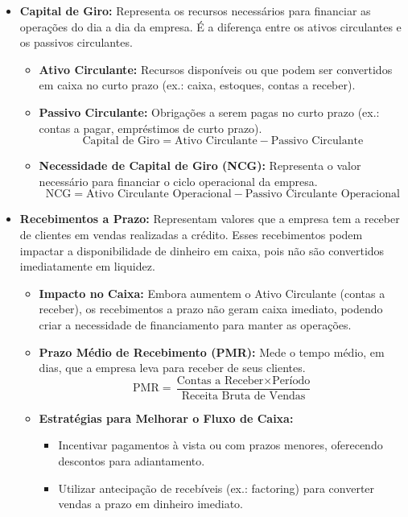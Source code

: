 \documentclass{article}
\begin{document}
\begin{itemize}
\begin{itemize}
\begin{equation}
        \end{equation}
    \end{itemize}
    \item \textbf{Capital de Giro:} Representa os recursos necessários para financiar as operações do dia a dia da empresa. É a diferença entre os ativos circulantes e os passivos circulantes. 
\begin{itemize}
    \item \textbf{Ativo Circulante:} Recursos disponíveis ou que podem ser convertidos em caixa no curto prazo (ex.: caixa, estoques, contas a receber). 
    \item \textbf{Passivo Circulante:} Obrigações a serem pagas no curto prazo (ex.: contas a pagar, empréstimos de curto prazo). 
    \begin{equation}
        \text{Capital de Giro} = \text{Ativo Circulante} - \text{Passivo Circulante}
    \end{equation}
    \item \textbf{Necessidade de Capital de Giro (NCG):} Representa o valor necessário para financiar o ciclo operacional da empresa. 
        \begin{equation}
            \text{NCG} = \text{Ativo Circulante Operacional} - \text{Passivo Circulante Operacional}
        \end{equation}
    \end{itemize}

    \item \textbf{Recebimentos a Prazo:} Representam valores que a empresa tem a receber de clientes em vendas realizadas a crédito. Esses recebimentos podem impactar a disponibilidade de dinheiro em caixa, pois não são convertidos imediatamente em liquidez. 
\begin{itemize}
    \item \textbf{Impacto no Caixa:} Embora aumentem o Ativo Circulante (contas a receber), os recebimentos a prazo não geram caixa imediato, podendo criar a necessidade de financiamento para manter as operações. 
    \item \textbf{Prazo Médio de Recebimento (PMR):} Mede o tempo médio, em dias, que a empresa leva para receber de seus clientes. 
    \begin{equation}
        \text{PMR} = \frac{\text{Contas a Receber} \times \text{Período}}{\text{Receita Bruta de Vendas}}
    \end{equation}
    \item \textbf{Estratégias para Melhorar o Fluxo de Caixa:} 
    \begin{itemize}
        \item Incentivar pagamentos à vista ou com prazos menores, oferecendo descontos para adiantamento.
        \item Utilizar antecipação de recebíveis (ex.: factoring) para converter vendas a prazo em dinheiro imediato.
    \end{itemize}
\end{itemize}


\end{itemize}
\end{document}
